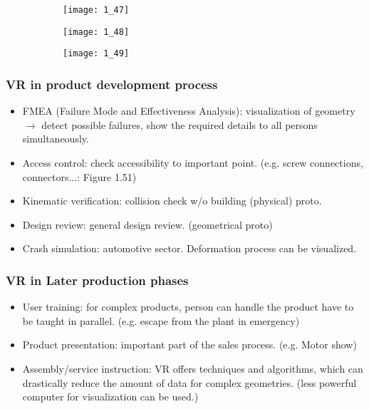 \documentclass{standalone}
\begin{document}
\begin{figure}[H]
	\centering
	\begin{subfigure}[b]{0.3\textwidth}	
		\texttt{[image: 1\_47]}
	\end{subfigure}
	\begin{subfigure}[b]{0.3\textwidth}	
		\texttt{[image: 1\_48]}
	\end{subfigure}
	\begin{subfigure}[b]{0.3\textwidth}	
		\texttt{[image: 1\_49]}
	\end{subfigure}
\end{figure}

\subsubsection*{VR in product development process}

\begin{itemize}
	\item FMEA (Failure Mode and Effectiveness Analysis): visualization of geometry $\rightarrow$ detect possible failures, show the required details to all persons simultaneously.
	\item Access control: check accessibility to important point. (e.g. screw connections, connectors...: Figure 1.51)
	\item Kinematic verification: collision check w/o building (physical) proto.
	\item Design review: general design review. (geometrical proto)
	\item Crash simulation: automotive sector. Deformation process can be visualized.  
\end{itemize}

\subsubsection*{VR in Later production phases}

\begin{itemize}
	\item User training: for complex products, person can handle the product have to be taught in parallel. (e.g. escape from the plant in emergency)
	\item Product presentation: important part of the sales process. (e.g. Motor show)
	\item Assembly/service instruction: VR offers techniques and algorithms, which can drastically reduce the amount of data for complex geometries. (less powerful computer for visualization can be used.)
\end{itemize}
\end{document}

